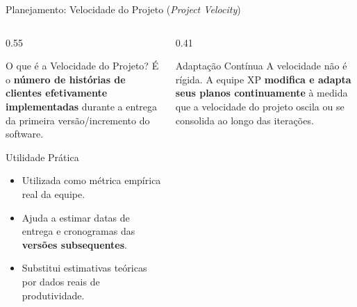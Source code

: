 \documentclass[aspectratio=169, 9pt]{beamer}
\begin{document}
\begin{frame}{Planejamento: Velocidade do Projeto (\textit{Project Velocity})}
  \begin{columns}[T]
    \begin{column}{0.55\textwidth}
      \begin{block}{O que é a Velocidade do Projeto?}
        É o \textbf{número de histórias de clientes efetivamente implementadas} durante a entrega da primeira versão/incremento do software.
      \end{block}
      
      \vspace{0.2cm}
      
      \begin{exampleblock}{Utilidade Prática}
        \begin{itemize}
          \item Utilizada como métrica empírica real da equipe.
          \item Ajuda a estimar datas de entrega e cronogramas das \textbf{versões subsequentes}.
          \item Substitui estimativas teóricas por dados reais de produtividade.
        \end{itemize}
      \end{exampleblock}
    \end{column}
    
    \begin{column}{0.41\textwidth}
      \begin{alertblock}{Adaptação Contínua}
        A velocidade não é rígida. A equipe XP \textbf{modifica e adapta seus planos continuamente} à medida que a velocidade do projeto oscila ou se consolida ao longo das iterações.
      \end{alertblock}
    \end{column}
  \end{columns}
\end{frame}
\end{document}
